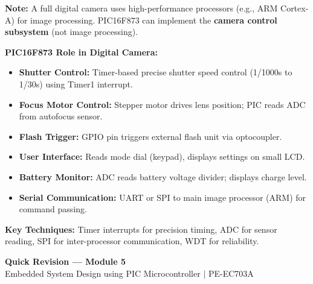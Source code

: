 \documentclass[12pt,a4paper]{article}
\begin{document}
\begin{tcolorbox}[examplebox, title={\textbf{Digital Camera Controller using PIC (Concept)}}]
\textbf{Note:} A full digital camera uses high-performance processors (e.g., ARM Cortex-A) for image processing. PIC16F873 can implement the \textbf{camera control subsystem} (not image processing).

\textbf{PIC16F873 Role in Digital Camera:}
\begin{itemize}[leftmargin=*, itemsep=2pt, topsep=4pt]
  \item \textbf{Shutter Control:} Timer-based precise shutter speed control (1/1000s to 1/30s) using Timer1 interrupt.
  \item \textbf{Focus Motor Control:} Stepper motor drives lens position; PIC reads ADC from autofocus sensor.
  \item \textbf{Flash Trigger:} GPIO pin triggers external flash unit via optocoupler.
  \item \textbf{User Interface:} Reads mode dial (keypad), displays settings on small LCD.
  \item \textbf{Battery Monitor:} ADC reads battery voltage divider; displays charge level.
  \item \textbf{Serial Communication:} UART or SPI to main image processor (ARM) for command passing.
\end{itemize}

\textbf{Key Techniques:} Timer interrupts for precision timing, ADC for sensor reading, SPI for inter-processor communication, WDT for reliability.
\end{tcolorbox}

\newpage
\begin{center}
  {\large\bfseries\color{myred} Quick Revision --- Module 5}\\[3pt]
  {\small\color{mydark} Embedded System Design using PIC Microcontroller $|$ PE-EC703A}
\end{center}
\noindent{\color{myred}\rule{\linewidth}{1.2pt}}
\vspace{4pt}
\end{document}
